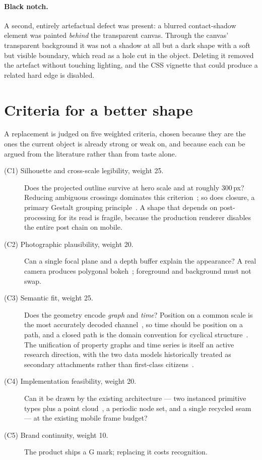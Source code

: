 \documentclass[11pt,a4paper]{article}
\theoremstyle{definition}
\begin{document}
\paragraph{Black notch.} A second, entirely artefactual defect was present: a
blurred contact-shadow element was painted \emph{behind} the transparent
canvas. Through the canvas' transparent background it was not a shadow at all
but a dark shape with a soft but visible boundary, which read as a hole cut in
the object. Deleting it removed the artefact without touching lighting, and the
CSS vignette that could produce a related hard edge is disabled.

\section{Criteria for a better shape}
\label{sec:criteria}

A replacement is judged on five weighted criteria, chosen because they are the
ones the current object is already strong or weak on, and because each can be
argued from the literature rather than from taste alone.

\begin{description}
\item[(C1) Silhouette and cross-scale legibility, weight 25.] Does the
projected outline survive at hero scale and at roughly 300\,px? Reducing
ambiguous crossings dominates this criterion~\cite{purchase1997}; so does
closure, a primary Gestalt grouping
principle~\cite{wagemans2012}. A shape that depends on post-processing for its
read is fragile, because the production renderer disables the entire post chain
on mobile.
\item[(C2) Photographic plausibility, weight 20.] Can a single focal plane and
a depth buffer explain the appearance? A real camera produces polygonal
bokeh~\cite{mcintosh2012}; foreground and background must not swap.
\item[(C3) Semantic fit, weight 25.] Does the geometry encode \emph{graph} and
\emph{time}? Position on a common scale is the most accurately decoded
channel~\cite{cleveland1984}, so time should be position on a path, and a
closed path is the domain convention for cyclical
structure~\cite{franke2023,rakuschek2026}. The unification of property graphs
and time series is itself an active research direction, with the two data
models historically treated as secondary attachments rather than first-class
citizens~\cite{hygraph2025,bonfietti2026}.
\item[(C4) Implementation feasibility, weight 20.] Can it be drawn by the
existing architecture --- two instanced primitive types plus a point
cloud~\cite{threejs}, a periodic node set, and a single recycled seam --- at
the existing mobile frame budget?
\item[(C5) Brand continuity, weight 10.] The product ships a G mark; replacing
it costs recognition.
\end{description}
\end{document}
